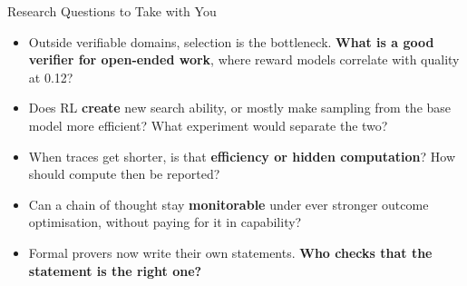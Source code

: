 \begin{frame}{Research Questions to Take with You}
    \begin{itemize}\itemsep0.5em
        \item Outside verifiable domains, selection is the bottleneck. \textbf{What is a good verifier for open-ended work}, where reward models correlate with quality at 0.12?
        \item Does RL \textbf{create} new search ability, or mostly make sampling from the base model more efficient? What experiment would separate the two?
        \item When traces get shorter, is that \textbf{efficiency or hidden computation}? How should compute then be reported?
        \item Can a chain of thought stay \textbf{monitorable} under ever stronger outcome optimisation, without paying for it in capability?
        \item Formal provers now write their own statements. \textbf{Who checks that the statement is the right one?}
    \end{itemize}
\end{frame}
